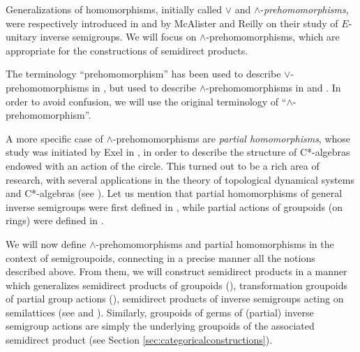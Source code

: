 Generalizations of homomorphisms, initially called $\lor$ and $\land$-\emph{prehomomorphisms}, were respectively introduced in \cite[Definition 1.1]{MR0424979} and \cite[Definition 4.1]{MR0470123} by McAlister and Reilly on their study of $E$-unitary inverse semigroups. We will focus on $\land$-prehomomorphisms, which are appropriate for the constructions of semidirect products.

\begin{remark}
    The terminology ``prehomomorphism'' has been used to describe  $\lor$-prehomomorphisms in \cite[p.\ 80]{MR1694900}, but used to describe $\land$-prehomomorphisms in \cite[VI.7.2]{MR752899} and \cite{Mikola2017}. In order to avoid confusion, we will use the original terminology of ``$\land$-prehomomorphism''.
\end{remark}

A more specific case of $\land$-prehomomorphisms are \emph{partial homomorphisms}, whose study was initiated by Exel in \cite{MR1276163}, in order to describe the structure of C*-algebras endowed with an action of the circle. This turned out to be a rich area of research, with several applications in the theory of topological dynamical systems and C*-algebras (see \cite{MR2799098,MR3699795}). Let us mention that partial homomorphisms of general inverse semigroups were first defined in \cite{MR3231479}, while partial actions of groupoids (on rings) were defined in \cite{MR2982887}.

We will now define $\land$-prehomomorphisms and partial homomorphisms in the context of semigroupoids, connecting in a precise manner all the notions described above. From them, we will construct semidirect products in a manner which generalizes semidirect products of groupoids (\cite[Exercise 11.5.1]{MR2273730}), transformation groupoids of partial group actions (\cite{MR2045419}), semidirect products of inverse semigroups acting on semilattices (see \cite[Lemma 1.1]{MR0357660.1} and \cite[VI.7.6-7]{MR752899}). Similarly, groupoids of germs of (partial) inverse semigroup actions are simply the underlying groupoids of the associated semidirect product (see Section \ref{sec:categoricalconstructions}).


